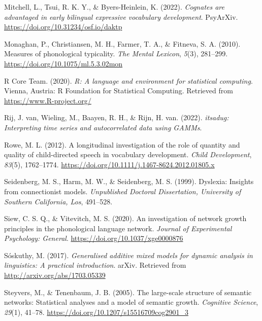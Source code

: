 \documentclass[
  man]{apa6}
\newlength{\cslhangindent}
\newlength{\cslentryspacingunit} %
\newenvironment{CSLReferences}[2] %
 {%
  \setlength{\parindent}{0pt}
  \ifodd #1
  \let\oldpar\par
  \def\par{\hangindent=\cslhangindent\oldpar}
  \fi
  \setlength{\parskip}{#2\cslentryspacingunit}
 }%
 {}
\begin{document}
\begin{CSLReferences}{1}{0}
\leavevmode{}%
Mitchell, L., Tsui, R. K. Y., \& Byers-Heinlein, K. (2022). \emph{Cognates are advantaged in early bilingual expressive vocabulary development}. {PsyArXiv}. \url{https://doi.org/10.31234/osf.io/daktp}

\leavevmode{}%
Monaghan, P., Christiansen, M. H., Farmer, T. A., \& Fitneva, S. A. (2010). Measures of phonological typicality. \emph{The Mental Lexicon}, \emph{5}(3), 281--299. \url{https://doi.org/10.1075/ml.5.3.02mon}

\leavevmode{}%
R Core Team. (2020). \emph{R: A language and environment for statistical computing}. Vienna, Austria: R Foundation for Statistical Computing. Retrieved from \url{https://www.R-project.org/}

\leavevmode{}%
Rij, J. van, Wieling, M., Baayen, R. H., \& Rijn, H. van. (2022). \emph{{itsadug}: Interpreting time series and autocorrelated data using GAMMs}.

\leavevmode{}%
Rowe, M. L. (2012). A longitudinal investigation of the role of quantity and quality of child-directed speech in vocabulary development. \emph{Child Development}, \emph{83}(5), 1762--1774. \url{https://doi.org/10.1111/j.1467-8624.2012.01805.x}

\leavevmode{}%
Seidenberg, M. S., Harm, M. W., \& Seidenberg, M. S. (1999). Dyslexia: Insights from connectionist models. \emph{Unpublished Doctoral Dissertation, University of Southern California, Los}, 491--528.

\leavevmode{}%
Siew, C. S. Q., \& Vitevitch, M. S. (2020). An investigation of network growth principles in the phonological language network. \emph{Journal of Experimental Psychology: General}. \url{https://doi.org/10.1037/xge0000876}

\leavevmode{}%
Sóskuthy, M. (2017). \emph{Generalised additive mixed models for dynamic analysis in linguistics: A practical introduction}. arXiv. Retrieved from \url{http://arxiv.org/abs/1703.05339}

\leavevmode{}%
Steyvers, M., \& Tenenbaum, J. B. (2005). The large-scale structure of semantic networks: Statistical analyses and a model of semantic growth. \emph{Cognitive Science}, \emph{29}(1), 41--78. \url{https://doi.org/10.1207/s15516709cog2901_3}


\end{CSLReferences}
\end{document}
